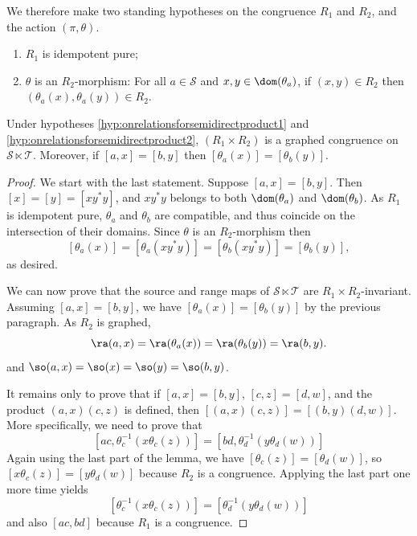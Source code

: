 We therefore make two standing hypotheses on the congruence $R_1$ and $R_2$, and the action $(\pi,\theta)$.

\begin{enumerate}[label=(H\arabic*)]
\item\label{hyp:onrelationsforsemidirectproduct1} $R_1$ is idempotent pure;
\item\label{hyp:onrelationsforsemidirectproduct2} $\theta$ is an $R_2$-morphism: For all $a\in\mathcal{S}$ and $x,y\in\dom(\theta_a)$, if $(x,y)\in R_2$ then $(\theta_a(x),\theta_a(y))\in R_2$.
\end{enumerate}

\begin{lemma}\label{lem:hypmakeformulasgood}
Under hypotheses \ref{hyp:onrelationsforsemidirectproduct1} and \ref{hyp:onrelationsforsemidirectproduct2}, $(R_1\times R_2)$ is a graphed congruence on $\mathcal{S}\ltimes\mathcal{T}$. Moreover, if $[a,x]=[b,y]$ then $[\theta_a(x)]=[\theta_b(y)]$.
\end{lemma}
\begin{proof}
    We start with the last statement. Suppose $[a,x]=[b,y]$. Then
    $[x]=[y]=[xy^*y]$, and $xy^*y$ belongs to both $\dom(\theta_a)$ and $\dom(\theta_b)$. As $R_1$ is idempotent pure, $\theta_a$ and $\theta_b$ are compatible, and thus coincide on the intersection of their domains. Since $\theta$ is an $R_2$-morphism then
    \[[\theta_a(x)]=[\theta_a(xy^*y)]=[\theta_b(xy^*y)]=[\theta_b(y)],\]
    as desired.
    
    We can now prove that the source and range maps of $\mathcal{S}\ltimes\mathcal{T}$ are $R_1\times R_2$-invariant. Assuming $[a,x]=[b,y]$, we have $[\theta_a(x)]=[\theta_b(y)]$ by the previous paragraph. As $R_2$ is graphed,
    \[\ra(a,x)=\ra(\theta_a(x))=\ra(\theta_b(y))=\ra(b,y).\]
    and $\so(a,x)=\so(x)=\so(y)=\so(b,y)$.
    
    It remains only to prove that if $[a,x]=[b,y]$, $[c,z]=[d,w]$, and the product $(a,x)(c,z)$ is defined, then $[(a,x)(c,z)]=[(b,y)(d,w)]$. More specifically, we need to prove that
    \[[ac,\theta_c^{-1}(x\theta_c(z))]=[bd,\theta_d^{-1}(y\theta_d(w))]\]
    Again using the last part of the lemma, we have $[\theta_c(z)]=[\theta_d(w)]$, so $[x\theta_c(z)]=[y\theta_d(w)]$ because $R_2$ is a congruence. Applying the last part one more time yields
    \[[\theta_c^{-1}(x\theta_c(z))]=[\theta_d^{-1}(y\theta_d(w))]\]
    and also $[ac,bd]$ because $R_1$ is a congruence.\qedhere
\end{proof}

